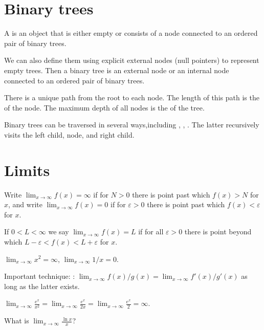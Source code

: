 \section{Binary trees}

A  is an object that is either empty or consists of a  node connected to an ordered pair of binary trees. 
 
We can also define them using explicit external nodes (null pointers) to represent empty trees. Then a binary tree is an external node or an internal node connected to an ordered pair of binary trees.

There is a unique path from the root to each node. The length of this path is the  of the node. The maximum depth of all nodes is the  of the tree.

Binary trees can be traversed in several ways,including , , . The latter recursively visits the left child, node, and right child.

\section{Limits}

Write $\lim_{x\to \infty} f(x) = \infty$ if for  $N>0$ there is  point past which $f(x) > N$ for  $x$, and write $\lim_{x\to\infty} f(x) = 0$ if for  $\varepsilon>0$ there is  point past which $f(x) < \varepsilon$ for  $x$.

If $0 < L < \infty$ we say $\lim_{x\to\infty} f(x) = L$ if for all $\varepsilon > 0$ there is  point beyond which $L - \varepsilon < f(x) < L + \varepsilon$ for  $x$.

\begin{Example}
$\lim_{x\to\infty} x^2 = \infty$, $\lim_{x\to \infty} 1/x = 0$.
\end{Example}

Important technique: : $\lim_{x\to \infty} f(x)/g(x) = \lim_{x\to \infty} f'(x)/g'(x)$ as long as the latter exists. 

\begin{Example}
 $\lim_{x\to\infty} \frac{e^x}{x^2} =  \lim_{x\to\infty} \frac{e^x}{2x} = \lim_{x\to\infty} \frac{e^x}{2} = \infty$.
 \end{Example}
 
 \begin{Boxample}[5]
What is  $\lim_{x\to\infty} \frac{\ln x}{x}$?
 
 \end{Boxample}



